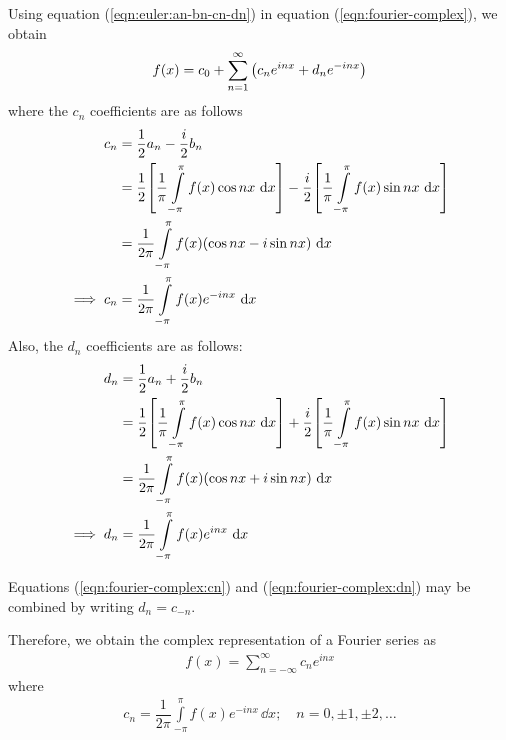    Using equation (\ref{eqn:euler:an-bn-cn-dn}) in equation (\ref{eqn:fourier-complex}), we obtain
    \begin{align}
        f(x)=c_0+\sum_{n=1}^{\infty}{\qty(c_ne^{inx}+d_ne^{-inx})} \label{eqn:fourier-complex-sum}
    \end{align}
    where the $c_n$ coefficients are as follows
    \begin{align}
        c_n&=\dfrac{1}{2}a_n-\dfrac{i}{2}b_n \nonumber\\
            &=\dfrac{1}{2}\qty[\dfrac{1}{\pi}\int\limits_{-\pi}^{\pi}{f(x)\cos{nx}\,\dd{x}}]-\dfrac{i}{2}\qty[\dfrac{1}{\pi}\int\limits_{-\pi}^{\pi}{f(x)\sin{nx}\,\dd{x}}] \nonumber\\
            &=\dfrac{1}{2\pi}\int\limits_{-\pi}^{\pi}{f(x)\qty(\cos{nx}-i\sin{nx})\,\dd{x}} \nonumber\\
        \implies c_n&=\dfrac{1}{2\pi}\int\limits_{-\pi}^{\pi}{f(x)e^{-inx}\,\dd{x}} \label{eqn:fourier-complex:cn}
    \end{align}
    Also, the $d_n$ coefficients are as follows:
    \begin{align}
        d_n&=\dfrac{1}{2}a_n+\dfrac{i}{2}b_n \nonumber\\
            &=\dfrac{1}{2}\qty[\dfrac{1}{\pi}\int\limits_{-\pi}^{\pi}{f(x)\cos{nx}\,\dd{x}}]+\dfrac{i}{2}\qty[\dfrac{1}{\pi}\int\limits_{-\pi}^{\pi}{f(x)\sin{nx}\,\dd{x}}] \nonumber\\
            &=\dfrac{1}{2\pi}\int\limits_{-\pi}^{\pi}{f(x)\qty(\cos{nx}+i\sin{nx})\,\dd{x}} \nonumber\\
        \implies d_n&=\dfrac{1}{2\pi}\int\limits_{-\pi}^{\pi}{f(x)e^{inx}\,\dd{x}} \label{eqn:fourier-complex:dn}
    \end{align}

    Equations (\ref{eqn:fourier-complex:cn}) and (\ref{eqn:fourier-complex:dn}) may be combined by writing $d_n=c_{-n}$.
    
    Therefore, we obtain the complex representation of a Fourier series as
    \begin{align*}
        f(x)=\sum_{n=-\infty}^{\infty}{c_ne^{inx}}
    \end{align*}
    where
    \begin{align*}
        c_n=\dfrac{1}{2\pi}\int\limits_{-\pi}^{\pi}{f(x)e^{-inx}\,\dd{x}};\quad n=0,\pm1,\pm2,\dots
    \end{align*}